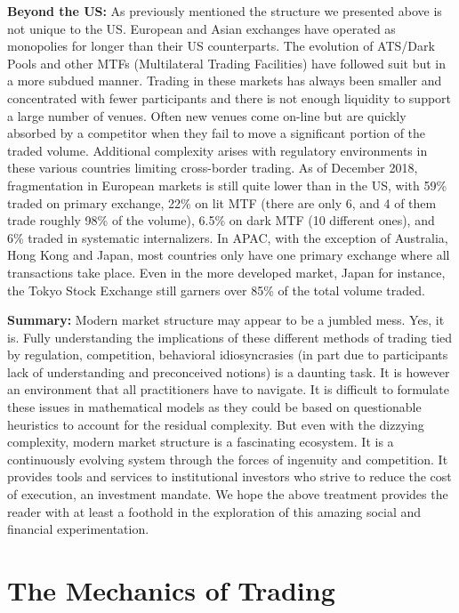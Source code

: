\noindent\textbf{Beyond the US:} As previously mentioned the structure we presented above is not unique to the US. European and Asian exchanges have operated as monopolies for longer than their US counterparts. The evolution of ATS/Dark Pools and other MTFs (Multilateral Trading Facilities) have followed suit but in a more subdued manner. Trading in these markets has always been smaller and concentrated with fewer participants and there is not enough liquidity to support a large number of venues. Often new venues come on-line but are quickly absorbed by a competitor when they fail to move a significant portion of the traded volume. Additional complexity arises with regulatory environments in these various countries limiting cross-border trading. As of December 2018, fragmentation in European markets is still quite lower than in the US, with 59\% traded on primary exchange, 22\% on lit MTF (there are only 6, and 4 of them trade roughly 98\% of the volume), 6.5\% on dark MTF (10 different ones), and 6\% traded in systematic internalizers. In APAC, with the exception of Australia, Hong Kong and Japan, most countries only have one primary exchange where all transactions take place. Even in the more developed market, Japan for instance, the Tokyo Stock Exchange still garners over 85\% of the total volume traded. \twomedskip


\noindent\textbf{Summary:} Modern market structure may appear to be a jumbled mess. Yes, it is. Fully understanding the implications of these different methods of trading tied by regulation, competition, behavioral idiosyncrasies (in part due to participants lack of understanding and preconceived notions) is a daunting task. It is however an environment that all practitioners have to navigate. It is difficult to formulate these issues in mathematical models as they could be based on questionable heuristics to account for the residual complexity. But even with the dizzying complexity, modern market structure is a fascinating ecosystem. It is a continuously evolving system through the forces of ingenuity and competition. It provides tools and services to institutional investors who strive to reduce the cost of execution, an investment mandate. We hope the above treatment provides the reader with at least a foothold in the exploration of this amazing social and financial experimentation.



\section{The Mechanics of Trading\label{sec:mech_trading}}\label{in:fund_trade1}

